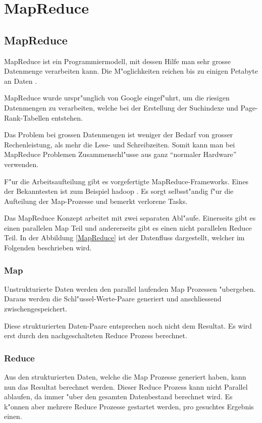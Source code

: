 \chapter{MapReduce}
\begin{refsection}

\section{MapReduce}
MapReduce ist ein Programmiermodell, mit dessen Hilfe man sehr grosse
Datenmenge verarbeiten kann.  Die M"oglichkeiten reichen bis zu
einigen Petabyte an Daten \cite{wiki:mapReduce}.

MapReduce wurde urspr"unglich von Google eingef"uhrt, um die riesigen
Datenmengen zu verarbeiten, welche bei der Erstellung der Suchindexe
und Page-Rank-Tabellen entstehen.

Das Problem bei grossen Datenmengen ist weniger der Bedarf von grosser
Rechenleistung, als mehr die Lese- und Schreibzeiten.  Somit kann man
bei MapReduce Problemen Zusammenschl"usse aus ganz \enquote{normaler
  Hardware} verwenden.

F"ur die Arbeitsaufteilung gibt es vorgefertigte
MapReduce-Frameworks.  Eines der Bekanntesten ist zum Beispiel hadoop
\cite{apache:hadoop}.  Es sorgt selbsst"andig f"ur die Aufteilung der
Map-Prozesse und bemerkt verlorene Tasks.

Das MapReduce Konzept arbeitet mit zwei separaten Abl"aufe.
Einerseits gibt es einen parallelen Map Teil und andererseits gibt es
einen nicht parallelen Reduce Teil.  In der Abbildung \ref{MapReduce}
ist der Datenfluss dargestellt, welcher im Folgenden beschrieben wird.

\subsection{Map}
Unstrukturierte Daten werden den parallel laufenden Map Prozessen
"ubergeben.  Daraus werden die Schl"ussel-Werte-Paare generiert und anschliessend zwischengespeichert.

Diese strukturierten Daten-Paare entsprechen noch nicht dem
Resultat. Es wird erst durch den nachgeschalteten Reduce Prozess
berechnet.

\subsection{Reduce}
Aus den strukturierten Daten, welche die Map Prozesse generiert haben,
kann nun das Resultat berechnet werden.  Dieser Reduce Prozess kann
nicht Parallel ablaufen, da immer "uber den gesamten Datenbestand
berechnet wird.  Es k"onnen aber mehrere Reduce Prozesse gestartet
werden, pro gesuchtes Ergebnis einen.


\end{refsection}
